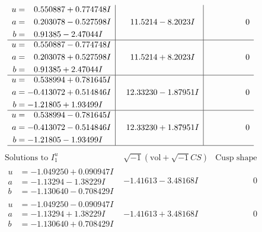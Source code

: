 \documentclass[1p]{elsarticle_modified}
\theoremstyle{definition}
\newcommand{\I}{\sqrt{-1}}
\begin{document}
$$\begin{array}{c|c|c}
\begin{aligned}
u &= \phantom{-}0.550887 + 0.774748 I \\
a &= \phantom{-}0.203078 - 0.527598 I \\
b &= \phantom{-}0.91385 - 2.47044 I\end{aligned}
 & \phantom{-}11.5214 - 8.2023 I & \phantom{-0.000000 } 0 \\ \hline\begin{aligned}
u &= \phantom{-}0.550887 - 0.774748 I \\
a &= \phantom{-}0.203078 + 0.527598 I \\
b &= \phantom{-}0.91385 + 2.47044 I\end{aligned}
 & \phantom{-}11.5214 + 8.2023 I & \phantom{-0.000000 } 0 \\ \hline\begin{aligned}
u &= \phantom{-}0.538994 + 0.781645 I \\
a &= -0.413072 + 0.514846 I \\
b &= -1.21805 + 1.93499 I\end{aligned}
 & \phantom{-}12.33230 - 1.87951 I & \phantom{-0.000000 } 0 \\ \hline\begin{aligned}
u &= \phantom{-}0.538994 - 0.781645 I \\
a &= -0.413072 - 0.514846 I \\
b &= -1.21805 - 1.93499 I\end{aligned}
 & \phantom{-}12.33230 + 1.87951 I & \phantom{-0.000000 } 0\\
 \hline 
 \end{array}$$\newpage$$\begin{array}{c|c|c}  
\text{Solutions to }I^u_{1}& \I (\text{vol} + \sqrt{-1}CS) & \text{Cusp shape}\\
 \hline 
\begin{aligned}
u &= -1.049250 + 0.090947 I \\
a &= -1.13294 - 1.38229 I \\
b &= -1.130640 - 0.708429 I\end{aligned}
 & -1.41613 - 3.48168 I & \phantom{-0.000000 } 0 \\ \hline\begin{aligned}
u &= -1.049250 - 0.090947 I \\
a &= -1.13294 + 1.38229 I \\
b &= -1.130640 + 0.708429 I\end{aligned}
 & -1.41613 + 3.48168 I & \phantom{-0.000000 } 0 \\ \hline\begin{aligned}

\end{aligned}
\end{array}$$
\end{document}
